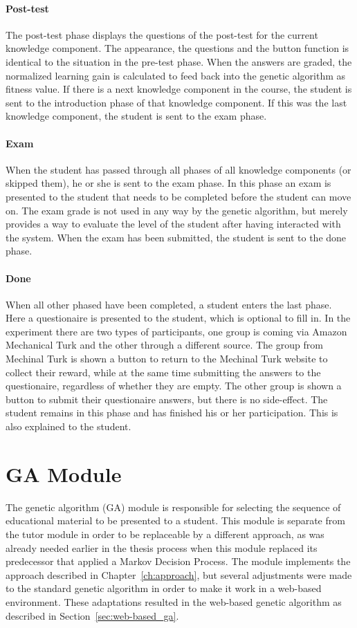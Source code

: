 \paragraph{Post-test} The post-test phase displays the questions of the
post-test for the current knowledge component. The appearance, the questions
and the button function is identical to the situation in the pre-test phase.
When the answers are graded, the normalized learning gain is calculated to
feed back into the genetic algorithm as fitness value. If there is a next
knowledge component in the course, the student is sent to the introduction
phase of that knowledge component. If this was the last knowledge component,
the student is sent to the exam phase.
\paragraph{Exam} When the student has passed through all phases of all
knowledge components (or skipped them), he or she is sent to the exam phase. In
this phase an exam is presented to the student that needs to be completed
before the student can move on. The exam grade is not used in any way by the
genetic algorithm, but merely provides a way to evaluate the level of the
student after having interacted with the system. When the exam has been
submitted, the student is sent to the done phase.
\paragraph{Done} When all other phased have been completed, a student enters
the last phase. Here a questionaire is presented to the student, which is
optional to fill in. In the experiment there are two types of participants, one
group is coming via Amazon Mechanical Turk and the other through a different
source. The group from Mechinal Turk is shown a button to return to the
Mechinal Turk website to collect their reward, while at the same time
submitting the answers to the questionaire, regardless of whether they are
empty. The other group is shown a button to submit their questionaire answers,
but there is no side-effect. The student remains in this phase and has finished
his or her participation. This is also explained to the student.

\section{GA Module}
\label{sec:software_ga_module}
The genetic algorithm (GA) module is responsible for selecting the sequence of
educational material to be presented to a student. This module is separate from
the tutor module in order to be replaceable by a different approach, as was
already needed earlier in the thesis process when this module replaced its
predecessor that applied a Markov Decision Process. The module implements the
approach described in Chapter~\ref{ch:approach}, but several adjustments were
made to the standard genetic algorithm in order to make it work in a web-based
environment. These adaptations resulted in the web-based genetic algorithm as
described in Section~\ref{sec:web-based_ga}.
